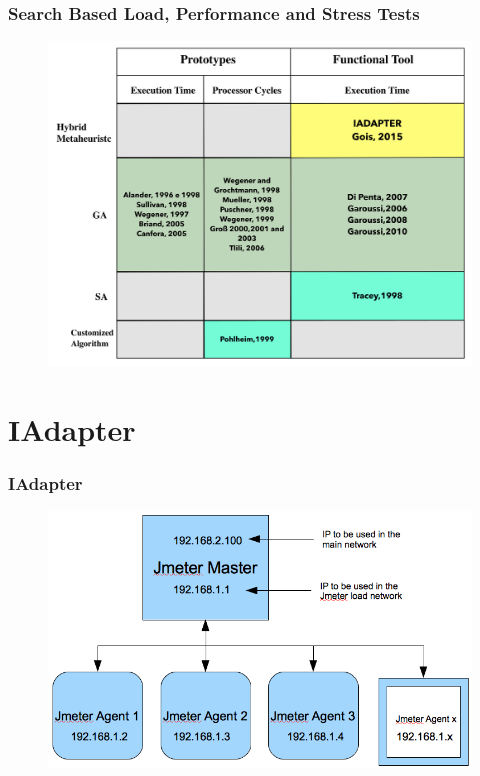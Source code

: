 \documentclass{beamer}
\begin{document}
\begin{frame}
\frametitle{Search Based Load, Performance and Stress Tests}
\begin{figure}[H]
\centering
\includegraphics[width=0.8\linewidth]{comparativo1.png}
\end{figure}
\end{frame}


\section{IAdapter}

\begin{frame}
\frametitle{IAdapter}
\begin{figure}[H]
\centering
\includegraphics[width=1\linewidth]{jmeter-distributed-structure.png}
\end{figure}
\end{frame}
\end{document}
